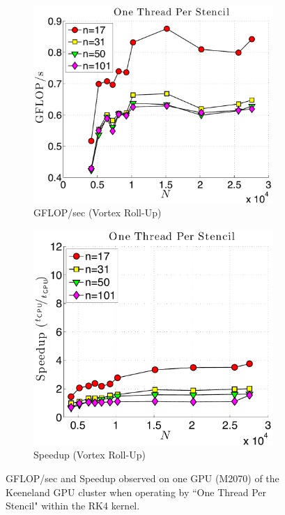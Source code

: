 \begin{figure}
\begin{subfigure}[t]{0.46\textwidth}
\includegraphics[width=\textwidth]{../figures/keeneland_results/alltoallv_vortex/gflops_gpu_1proc_oneThreadPerStencil.pdf}
\caption{GFLOP/sec (Vortex Roll-Up)}
\label{fig:gflops_gpu_1proc_oneThread_keeneland_vortex}
\end{subfigure}
\quad
\begin{subfigure}[t]{0.425\textwidth}
\includegraphics[width=\textwidth]{../figures/keeneland_results/alltoallv_vortex/speedup_1proc_oneThreadPerStencil.pdf}
\caption{Speedup (Vortex Roll-Up)}
\label{fig:speedup_1proc_oneThread_keeneland}
\end{subfigure} 
\caption{GFLOP/sec and Speedup observed on one GPU (M2070) of the Keeneland GPU cluster when operating by ``One Thread Per Stencil" within the RK4 kernel.}
\label{fig:1proc_oneThread_keeneland}
\end{figure} 

